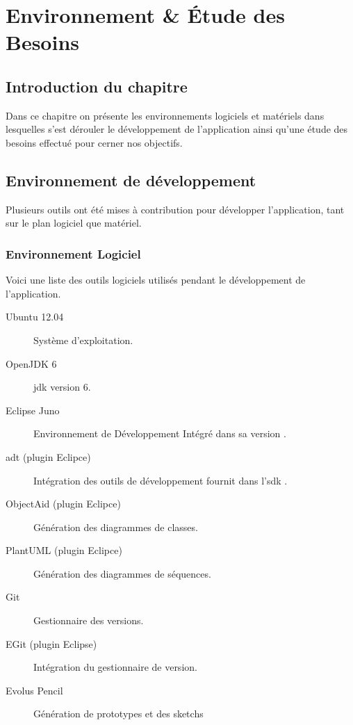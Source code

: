
\chapter{Environnement \& Étude des Besoins}

\section{Introduction du chapitre}

Dans ce chapitre on présente les environnements logiciels et matériels dans lesquelles s'est dérouler le développement de l'application ainsi qu'une étude des besoins effectué pour cerner nos objectifs.

\section{Environnement de développement}%

Plusieurs outils ont été mises à contribution pour développer l'application, tant sur le plan logiciel que matériel.

\subsection{Environnement Logiciel}
Voici une liste des outils logiciels utilisés pendant le développement de l'application.

\begin{description}

\item [Ubuntu 12.04] Système d'exploitation.\footnotemark[1]

\item [OpenJDK 6] \gls{jdk} version 6.\footnotemark[2]

\item [Eclipse Juno] Environnement de Développement Intégré dans sa version .\footnotemark[3]

\item [\gls{adt} (plugin Eclipce)] Intégration des outils de développement fournit dans l'\gls{sdk} \android{}.\footnotemark[4]

\item [ObjectAid (plugin Eclipce)] Génération des diagrammes de classes.\footnotemark[5]

\item [PlantUML (plugin Eclipce)] Génération des diagrammes de séquences.\footnotemark[6]

\item [Git] Gestionnaire des versions\footnotemark[7].

\item [EGit (plugin Eclipse)] Intégration du gestionnaire de version.\footnotemark[8]

\item [Evolus Pencil] Génération de prototypes et des sketchs\footnotemark[9]
\end{description}


